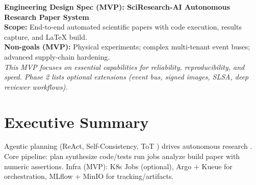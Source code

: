 \begin{center}
{\LARGE \textbf{Engineering Design Spec (MVP): SciResearch-AI Autonomous Research Paper System}}\\[6pt]
\textbf{Scope:} End-to-end automated scientific papers with code execution, results capture, and LaTeX build.\\[2pt]
\textbf{Non-goals (MVP):} Physical experiments; complex multi-tenant event buses; advanced supply-chain hardening.\\[4pt]
\textit{This MVP focuses on essential capabilities for reliability, reproducibility, and speed. Phase 2 lists optional extensions (event bus, signed images, SLSA, deep reviewer workflows).}
\end{center}

\section{Executive Summary}
Agentic planning (ReAct, Self-Consistency, ToT \cite{yao2023react,wang2022selfconsistency,yao2023tot}) drives autonomous research \cite{lu2024aiscientist}. Core pipeline: plan \textrightarrow{} synthesize code/tests \textrightarrow{} run jobs \textrightarrow{} analyze \textrightarrow{} build paper with numeric assertions. Infra (MVP): K8s Jobs (optional), Argo + Kueue for orchestration, MLflow + MinIO for tracking/artifacts.


